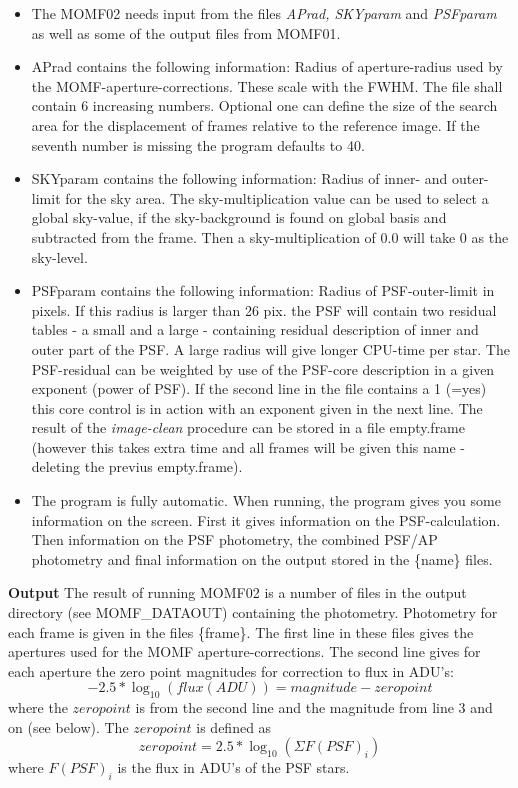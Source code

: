 \documentclass[]{article}
\begin{document}
\begin{itemize}
\item The MOMF02 needs input from the files {\em APrad, SKYparam} and {\em
PSFparam} as well as some of the output files from MOMF01.
\item APrad contains the following information: Radius of
aperture-radius used by the MOMF-aperture-corrections. These scale with
the FWHM. The file shall contain 6 increasing numbers. Optional one can define
the size of the search area for the displacement of frames relative to
the reference image. If the seventh number is missing the program 
defaults to 40.
\item SKYparam contains the following information: Radius of inner-
and outer-limit for the sky area. The sky-multiplication value can be
used to select a global sky-value, if the sky-background is found on
global basis and subtracted from the frame. Then a sky-multiplication of 0.0
will take 0 as the sky-level.
\item PSFparam contains the following information: Radius of
PSF-outer-limit in pixels. If this radius is larger than 26 pix. the PSF
will contain two residual tables - a small and a large - containing
residual description of inner and outer part of the PSF. A large radius
will give longer CPU-time per star. The PSF-residual can be weighted by
use of the PSF-core description in a given exponent (power of PSF). If
the second line in the file contains a 1 (=yes) this core control is in
action with an exponent given in the next line. The result of the
{\em image-clean}
procedure can be stored in a file empty.frame (however this takes
extra time and all frames will be given this name - deleting the
previus empty.frame).
\item 
The program is fully automatic. When running, the program gives
you some information on the screen. First it gives information on the
PSF-calculation. Then information on the PSF photometry, the combined
PSF/AP photometry and final information on
the output stored in the \{name\} files.
\end{itemize}
\vspace{2mm}
{\bf Output}
\vspace{4mm}
\newline The result of running MOMF02 is a number of files in the
output directory (see MOMF\_DATAOUT) containing
the photometry. Photometry for each frame is given in the files
\{frame\}. The first line in these files gives the
apertures used for the MOMF aperture-corrections. 
The second line gives for each aperture the zero point magnitudes
for correction to flux in ADU's:
\begin{equation}
-2.5*\log_{10}(flux(ADU)) = magnitude - zero point
\end{equation}
where the $zero point$ is from the second line and the magnitude from
line 3 and on (see below). The $zero point$ is defined as
\begin{equation}
zero point = 2.5*\log_{10}( \Sigma F(PSF)_i)
\end{equation}
where $F(PSF)_i$ is the flux in ADU's of the PSF stars.
\end{document}
